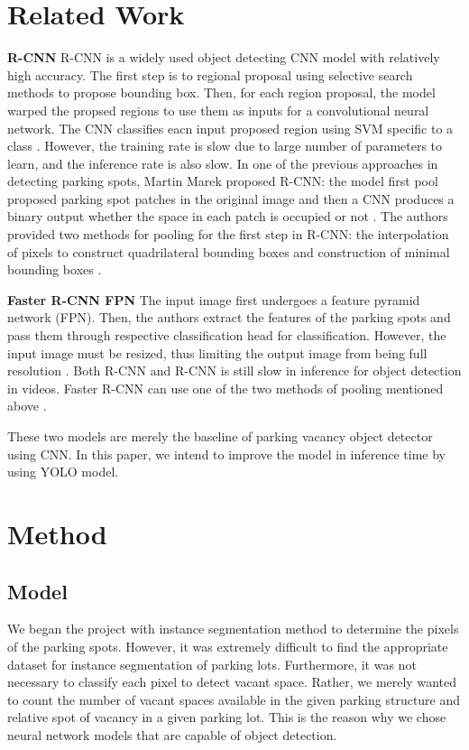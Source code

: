 \documentclass{article}
\begin{document}
\section{Related Work}

\textbf{R-CNN} \quad R-CNN \cite{DBLP:journals/corr/abs-2107-12207} is a widely used object detecting CNN model with relatively high accuracy. The first step is to regional proposal using selective search methods to propose bounding box. 
Then, for each region proposal, the model warped the propsed regions to use them as inputs for a convolutional neural network. The CNN classifies eacn input proposed region using SVM specific to a class \cite{girshick2014rich}. 
However, the training rate is slow due to large number of parameters to learn, and the inference rate is also slow. In one of the previous approaches in detecting parking spots, Martin Marek proposed R-CNN: the model first pool 
proposed parking spot patches in the original image and then a CNN produces a binary output whether the space in each patch is occupied or not \cite{DBLP:journals/corr/abs-2107-12207}. The authors provided two methods for pooling
for the first step in R-CNN: the interpolation of pixels to construct quadrilateral bounding boxes and construction of minimal bounding boxes \cite{DBLP:journals/corr/abs-2107-12207}. 

\textbf{Faster R-CNN FPN} The input image first undergoes a feature pyramid network (FPN). Then, the authors extract the features of the parking spots and pass them through respective classification head for classification. However, 
the input image must be resized, thus limiting the output image from being full resolution \cite{DBLP:journals/corr/abs-2107-12207}. Both R-CNN and R-CNN is still slow in inference for object detection in videos. Faster R-CNN can use
one of the two methods of pooling mentioned above \cite{DBLP:journals/corr/abs-2107-12207}. 

These two models are merely the baseline of parking vacancy object detector using CNN. In this paper, we intend to improve the model in inference time by using YOLO model. 

\section{Method}

\subsection{Model}
We began the project with instance segmentation method to determine the pixels of the parking spots. However, it was extremely difficult to find the appropriate dataset for instance segmentation of parking lots. Furthermore, it was not necessary to classify
each pixel to detect vacant space. Rather, we merely wanted to count the number of vacant spaces available in the given parking structure and relative spot of vacancy in a given parking lot. This is the reason why we chose neural network models that are capable 
of object detection. 
\end{document}
